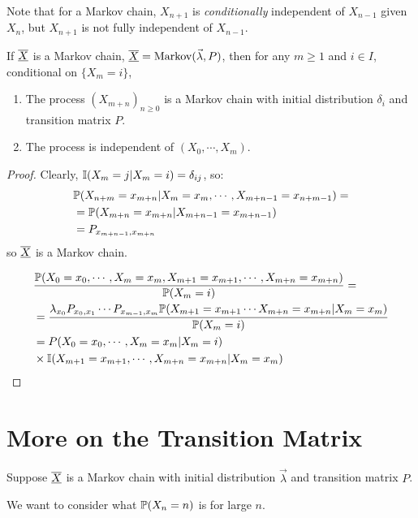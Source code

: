 \documentclass[../Main.tex]{subfiles}
\begin{document}
Note that for a Markov chain, $X_{n+1}$ is \textit{conditionally} independent of $X_{n-1}$ given $X_n$, but $X_{n+1}$ is not fully independent of $X_{n-1}$.
\begin{theorem}
    If $\chain{X}$ is a Markov chain, $\chain{X} = \text{Markov}(\vec{\lambda}, P)$, then for any $m \geq 1$ and $i \in I$, conditional on $\{X_m = i\}$,
    \begin{enumerate}
        \item The process $(X_{m + n})_{n \geq 0}$ is a Markov chain with initial distribution $\delta_i$ and transition matrix $P$.
        \item The process is independent of $(X_0, \cdots, X_m)$.
    \end{enumerate}
    \label{thmMarkovProperty}
\end{theorem}
\begin{proof}
    Clearly, $\ind{X_m = j | X_m = i} = \delta_{ij}$, so:
    \begin{align*}
        &\P(X_{n + m} = x_{m + n} | X_m = x_m, \cdots, X_{m + n - 1} = x_{n + m - 1}) = \\
        &= \P(X_{m + n} = x_{m + n} | X_{m + n - 1} = x_{m + n - 1}) \\
        &= \Pmat{m + n - 1}{m + n}
    \end{align*}
    so $\chain{X}$ is a Markov chain.

    \begin{align*}
        &\frac{\P(X_0 = x_0, \cdots, X_m = x_m, X_{m + 1} = x_{m + 1}, \cdots, X_{m + n} = x_{m + n})}{\P(X_m = i)} = \\
        &= \frac{\lambda_{x_0} \Pmat{0}{1} \cdots \Pmat{m-1}{m} \P(X_{m + 1} = x_{m + 1} \cdots X_{m + n} = x_{m + n} | X_m = x_m)}{\P(X_m = i)} \\
        &= P(X_0 = x_0, \cdots, X_m = x_m | X_m = i) \\
        &\times \ind{X_{m + 1} = x_{m + 1}, \cdots, X_{m + n} = x_{m + n} | X_m = x_m}
    \end{align*}
\end{proof}
\section{More on the Transition Matrix}
Suppose $\chain{X}$ is a Markov chain with initial distribution $\vec{\lambda}$ and transition matrix $P$.

We want to consider what $\P(X_n = n)$ is for large $n$.
\end{document}
